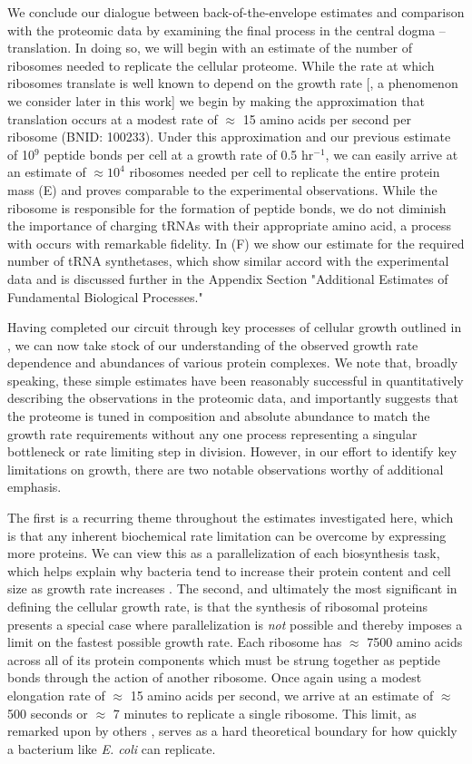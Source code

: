 We conclude our dialogue between back-of-the-envelope estimates and comparison
with the proteomic data by examining the final process in the central dogma --
translation. In doing so, we will begin with an estimate of the number of
ribosomes needed to replicate the cellular proteome. While the rate at which
ribosomes translate is well known to depend on the growth rate [\cite{dai2018},
a phenomenon we consider later in this work] we begin by making the
approximation that translation occurs at a modest rate of $\approx$ 15 amino
acids per second per ribosome (BNID: 100233). Under this approximation and our
previous estimate of 10$^{9}$ peptide bonds per cell at a growth rate of 0.5
hr$^{-1}$, we can easily arrive at an estimate of $\approx 10^4$ ribosomes
needed per cell to replicate the entire protein mass (E) and
proves comparable to the experimental observations. While the ribosome is
responsible for the formation of peptide bonds, we do not diminish the
importance of charging tRNAs with their appropriate amino acid, a process with
occurs with remarkable fidelity. In (F) we show our estimate
for the required number of tRNA synthetases, which show similar accord with the
experimental data and is discussed further in the Appendix Section "Additional
Estimates of Fundamental Biological Processes."

Having completed our circuit through key processes of cellular growth outlined
in , we can now take stock of our understanding of the observed
growth rate dependence and abundances of various protein complexes. We note
that, broadly speaking, these simple estimates have been reasonably successful
in quantitatively describing the observations in the proteomic data, and
importantly suggests that the proteome is tuned in composition and absolute
abundance to match the growth rate requirements without any one process
representing a singular bottleneck or rate limiting step in division. However,
in our effort to identify key limitations on growth, there are two notable
observations worthy of additional emphasis.

The first is a recurring theme throughout the estimates investigated here, which
is that any inherent biochemical rate limitation can be overcome by expressing
more proteins. We can view this as a parallelization of each biosynthesis task,
which helps explain why bacteria tend to increase their protein content and
cell size as growth rate increases \citep{ojkic2019}. The second, and
ultimately the most significant in defining the cellular growth rate, is that
the synthesis of ribosomal proteins presents a special case where
parallelization is \textit{not} possible and thereby imposes a limit on the
fastest possible growth rate. Each ribosome has $\approx$ 7500 amino acids
across all of its protein components which must be strung together as peptide
bonds through the action of another ribosome. Once again using a modest
elongation rate of $\approx$ 15 amino acids per second, we arrive at an estimate of
$\approx$ 500 seconds or $\approx$ 7 minutes to replicate a single ribosome.
This limit, as remarked upon by others \citep{dill2011}, serves as a hard
theoretical boundary for how quickly a bacterium like \textit{E. coli} can
replicate.


